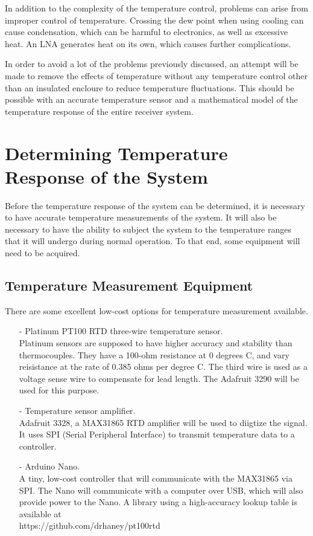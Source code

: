 \documentclass[letterpaper, 12pt]{article}
\begin{document}
In addition to the complexity of the temperature control, problems can arise from improper control of temperature. Crossing the dew point when using cooling can cause condensation, which can be harmful to electronics, as well as excessive heat. An LNA generates heat on its own, which causes further complications.

In order to avoid a lot of the problems previously discussed, an attempt will be made to remove the effects of temperature without any temperature control other than an insulated encloure to reduce temperature fluctuations. This should be possible with an accurate temperature sensor and a mathematical model of the temperature response of the entire receiver system.

\section{Determining Temperature Response of the System}
Before the temperature response of the system can be determined, it is necessary to have accurate temperature measurements of the system. It will also be necessary to have the ability to subject the system to the temperature ranges that it will undergo during normal operation. To that end, some equipment will need to be acquired.

\subsection{Temperature Measurement Equipment}
There are some excellent low-cost options for temperature measurement available. 

\begin{itemize}
	\item[-] Platinum PT100 RTD three-wire temperature sensor. 
	\\Platinum sensors are supposed to have higher accuracy and stability 			than thermocouples. They have a 100-ohm resistance at 0 degrees C, and 			vary reisistance at the rate of 0.385 ohms per degree C. The third wire 	is used as a voltage sense wire to compensate for lead length. The 				Adafruit 3290 will be used for this purpose.
	\item[-] Temperature sensor amplifier.
	\\Adafruit 3328, a MAX31865 RTD amplifier will be used to diigtize the 			signal.  It uses SPI (Serial Peripheral Interface) to transmit 					temperature data to a controller.
	\item[-] Arduino Nano.
	\\A tiny, low-cost controller that will communicate with the MAX31865 			via SPI.  The Nano will communicate with a computer over USB, which 			will also provide power to the Nano.  A library using a high-accuracy 			lookup table is available at \\
	https://github.com/drhaney/pt100rtd
\end{itemize}
\end{document}

